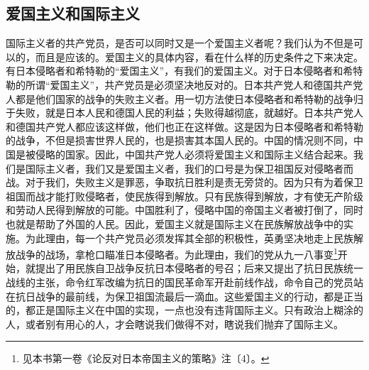 \documentclass[cn,11pt,chinese]{elegantbook}
\def\myformat#1{\hfil\hfil #1}
\begin{document}
\subsection*{\myformat{爱国主义和国际主义}}
国际主义者的共产党员，是否可以同时又是一个爱国主义者呢？我们认为不但是可以的，而且是应该的。爱国主义的具体内容，看在什么样的历史条件之下来决定。有日本侵略者和希特勒的“爱国主义”，有我们的爱国主义。对于日本侵略者和希特勒的所谓“爱国主义”，共产党员是必须坚决地反对的。日本共产党人和德国共产党人都是他们国家的战争的失败主义者。用一切方法使日本侵略者和希特勒的战争归于失败，就是日本人民和德国人民的利益；失败得越彻底，就越好。日本共产党人和德国共产党人都应该这样做，他们也正在这样做。这是因为日本侵略者和希特勒的战争，不但是损害世界人民的，也是损害其本国人民的。中国的情况则不同，中国是被侵略的国家。因此，中国共产党人必须将爱国主义和国际主义结合起来。我们是国际主义者，我们又是爱国主义者，我们的口号是为保卫祖国反对侵略者而战。对于我们，失败主义是罪恶，争取抗日胜利是责无旁贷的。因为只有为着保卫祖国而战才能打败侵略者，使民族得到解放。只有民族得到解放，才有使无产阶级和劳动人民得到解放的可能。中国胜利了，侵略中国的帝国主义者被打倒了，同时也就是帮助了外国的人民。因此，爱国主义就是国际主义在民族解放战争中的实施。为此理由，每一个共产党员必须发挥其全部的积极性，英勇坚决地走上民族解放战争的战场，拿枪口瞄准日本侵略者。为此理由，我们的党从九一八事变\footnote[1]{ 见本书第一卷《论反对日本帝国主义的策略》注〔4〕。}开始，就提出了用民族自卫战争反抗日本侵略者的号召；后来又提出了抗日民族统一战线的主张，命令红军改编为抗日的国民革命军开赴前线作战，命令自己的党员站在抗日战争的最前线，为保卫祖国流最后一滴血。这些爱国主义的行动，都是正当的，都正是国际主义在中国的实现，一点也没有违背国际主义。只有政治上糊涂的人，或者别有用心的人，才会瞎说我们做得不对，瞎说我们抛弃了国际主义。\\
\end{document}
